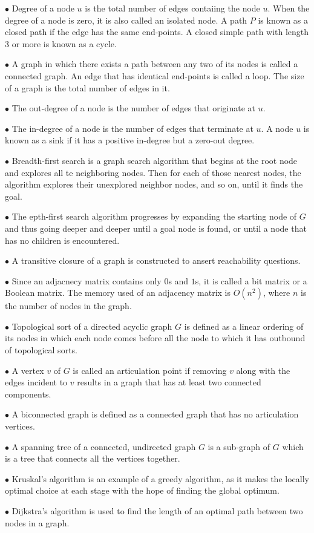 \vskip 3mm
\qquad$\bullet$ Degree of a node $u$ is the total number of edges contaiing the node $u$. When the degree of a node is zero, it is also called an isolated node. A path $P$ is known as a closed path if the edge has the same end-points. A closed simple path with length $3$ or more is known as a cycle.

\vskip 3mm
\qquad$\bullet$ A graph in which there exists a path between any two of its nodes is called a connected graph. An edge that has identical end-points is called a loop. The size of a graph is the total number of edges in it.

\vskip 3mm
\qquad$\bullet$ The out-degree of a node is the number of edges that originate at $u$.

\vskip 3mm
\qquad$\bullet$ The in-degree of a node is the number of edges that terminate at $u$. A node $u$ is known as a sink if it has a positive in-degree but a zero-out degree.

\vskip 3mm
\qquad$\bullet$ Breadth-first search is a graph search algorithm that begins at the root node and explores all te neighboring nodes. Then for each of those nearest nodes, the algorithm explores their unexplored neighbor nodes, and so on, until it finds the goal.

\vskip 3mm
\qquad$\bullet$ The epth-first search algorithm progresses by expanding the starting node of $G$ and thus going deeper and deeper until a goal node is found, or until a node that has no children is encountered.

\vskip 3mm
\qquad$\bullet$ A transitive closure of a graph is constructed to ansert reachability questions.

\vskip 3mm
\qquad$\bullet$ Since an adjacnecy matrix contains only $0$s and $1$s, it is called a bit matrix or a Boolean matrix. The memory used of an adjacency matrix is $O(n^2)$, where $n$ is the number of nodes in the graph.

\vskip 3mm
\qquad$\bullet$ Topological sort of a directed acyclic graph $G$ is defined as a linear ordering of its nodes in which each node comes before all the node to which it has outbound of topological sorts.

\vskip 3mm
\qquad$\bullet$ A vertex $v$ of $G$ is called an articulation point if removing $v$ along with the edges incident to $v$ results in a graph that has at least two connected components.

\vskip 3mm
\qquad$\bullet$ A biconnected graph is defined as a connected graph that has no articulation vertices.

\vskip 3mm
\qquad$\bullet$ A spanning tree of a connected, undirected graph $G$ is a sub-graph of $G$ which is a tree that connects all the vertices together.

\vskip 3mm
\qquad$\bullet$ Kruskal's algorithm is an example of a greedy algorithm, as it makes the locally optimal choice at each stage with the hope of finding the global optimum.

\vskip 3mm
\qquad$\bullet$ Dijkstra's algorithm is used to find the length of an optimal path between two nodes in a graph.



\vfill\eject
\bye
